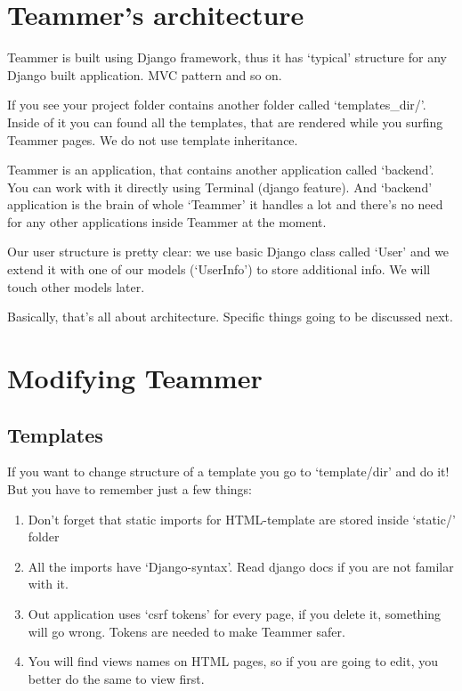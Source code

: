 \documentclass{report}
\begin{document}
\section{Teammer’s architecture}
Teammer is built using Django framework, thus it has ‘typical’ structure for any Django built application. MVC pattern and so on.

If you see your project folder contains another folder called ‘templates\_dir/’. Inside of it you can found all the templates, that are rendered while you surfing Teammer pages. We do not use template inheritance.

Teammer is an application, that contains another application called ‘backend’. You can work with it directly using Terminal (django feature). And ‘backend’ application is the brain of whole ‘Teammer’ it handles a lot and there’s no need for any other applications inside Teammer at the moment.

Our user structure is pretty clear: we use basic Django class called ‘User’ and we extend it with one of our models (‘UserInfo’) to store additional info. We will touch other models later.

Basically, that’s all about architecture. Specific things going to be discussed next.

\section{Modifying Teammer}
\subsection{Templates}
If you want to change structure of a template you go to ‘template/dir’ and do it! But you have to remember just a few things:
\begin{enumerate}
\item Don’t forget that static imports for HTML-template are stored inside ‘static/’ folder
\item All the imports have ‘Django-syntax’. Read django docs if you are not familar with it.
\item Out application uses ‘csrf tokens’ for every page, if you delete it, something will go wrong. Tokens are needed to make Teammer safer.
\item You will find views names on HTML pages, so if you are going to edit, you better do the same to view first.
\end{enumerate}
\end{document}
